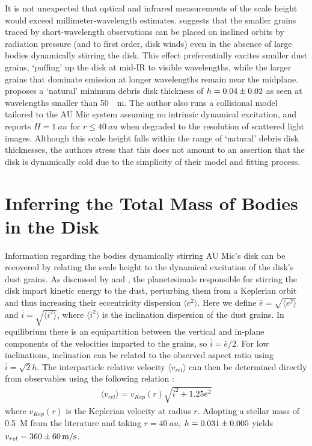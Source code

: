 \documentclass[12pt,oneside]{book}
\begin{document}
It is not unexpected that optical and infrared measurements of the scale height would exceed millimeter-wavelength estimates.
\cite{thebault09} suggests that the smaller grains traced by short-wavelength observations can be placed on inclined orbits by radiation pressure (and to first order, disk winds) even in the absence of large bodies dynamically stirring the disk. 
This effect preferentially excites smaller dust grains, `puffing' up the disk at mid-IR to visible wavelengths, while the larger grains that dominate emission at longer wavelengths remain near the midplane.
\cite{thebault09} proposes a `natural' minimum debris disk thickness of $h = \num{0.04 \pm 0.02}$ as seen at wavelengths smaller than \SI{50}{\mu \meter}.
The author also runs a collisional model tailored to the AU Mic system assuming no intrinsic dynamical excitation, and reports $H = \SI{1}{au}$ for $r \leq \SI{40}{au}$ when degraded to the resolution of scattered light images.
Although this scale height falls within the range of `natural' debris disk thicknesses, the authors stress that this does not amount to an assertion that the disk is dynamically cold due to the simplicity of their model and fitting process.

\section{Inferring the Total Mass of Bodies in the Disk}
\label{inferring mass}

Information regarding the bodies dynamically stirring AU Mic's disk can be recovered by relating the scale height to the dynamical excitation of the disk's dust grains.
As discussed by \cite{thebault09} and \cite{quillen07}, the planetesimals responsible for stirring the disk impart kinetic energy to the dust, perturbing them from a Keplerian orbit and thus increasing their eccentricity dispersion $\langle e^2 \rangle$. 
Here we define $\bar{e} = \sqrt{\langle e^2 \rangle}$ and $\bar{i} = \sqrt{\langle i^2 \rangle}$, where $\langle i^2 \rangle$ is the inclination dispersion of the dust grains.
In equilibrium there is an equipartition between the vertical and in-plane components of the velocities imparted to the grains, so $\bar{i} = {\bar{e}}/{2}$.
For low inclinations, inclination can be related to the observed aspect ratio using $\bar{i} = \sqrt{2}h$.
The interparticle relative velocity $\langle v_{rel} \rangle$ can then be determined directly from observables using the following relation \citep{wetherill&stewart93,wyatt&dent02}:
\begin{gather}
  \langle v_{rel} \rangle = v_{Kep}(r) \sqrt{\bar{i}^2 + 1.25 \bar{e}^2}
\end{gather}
where $v_{Kep}(r)$ is the Keplerian velocity at radius $r$. 
Adopting a stellar mass of \SI{0.5}{M_\sun} from the literature \citep{plavchan09,houdebine&doyle94} and taking $r = \SI{40}{au}$, $h=\num{0.031 \pm 0.005}$ yields $v_{rel} = \SI{360 \pm 60}{m/s}$.
\end{document}
